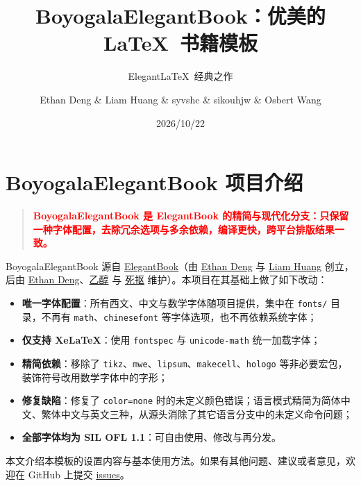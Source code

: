 \documentclass[lang=cn,10pt,scheme=chinese]{boyogalaelegantbook}
\title{BoyogalaElegantBook：优美的 \LaTeX\ 书籍模板}   %
\subtitle{Elegant\LaTeX\ 经典之作}                    %
\author{Ethan Deng \& Liam Huang \& syvshc \& sikouhjw \& Osbert Wang}  %
\institute{Elegant\LaTeX\ Program}                     %
\date{2026/10/22}                                        %
\begin{document}
\maketitle

\frontmatter

\tableofcontents

\mainmatter

\chapter{BoyogalaElegantBook 项目介绍}

\begin{quotation}
  \textbf{\textcolor{red}{BoyogalaElegantBook 是 ElegantBook 的精简与现代化分支：只保留一种字体配置，去除冗余选项与多余依赖，编译更快，跨平台排版结果一致。}}
\end{quotation}

BoyogalaElegantBook 源自 \href{https://github.com/ElegantLaTeX/ElegantBook}{ElegantBook}（由 \href{https://github.com/EthanDeng}{Ethan Deng} 与 \href{https://github.com/Liam0205}{Liam Huang} 创立，后由 \href{https://github.com/EthanDeng}{Ethan Deng}、\href{https://github.com/syvshc}{乙醇} 与 \href{https://github.com/sikouhjw}{死抠} 维护）。本项目在其基础上做了如下改动：

\begin{itemize}
  \item \textbf{唯一字体配置}：所有西文、中文与数学字体随项目提供，集中在 \lstinline{fonts/} 目录，不再有 \lstinline{math}、\lstinline{chinesefont} 等字体选项，也不再依赖系统字体；
  \item \textbf{仅支持 XeLaTeX}：使用 \lstinline{fontspec} 与 \lstinline{unicode-math} 统一加载字体；
  \item \textbf{精简依赖}：移除了 \lstinline{tikz}、\lstinline{mwe}、\lstinline{lipsum}、\lstinline{makecell}、\lstinline{hologo} 等非必要宏包，装饰符号改用数学字体中的字形；
  \item \textbf{修复缺陷}：修复了 \lstinline{color=none} 时的未定义颜色错误；语言模式精简为简体中文、繁体中文与英文三种，从源头消除了其它语言分支中的未定义命令问题；
  \item \textbf{全部字体均为 SIL OFL 1.1}：可自由使用、修改与再分发。
\end{itemize}

本文介绍本模板的设置内容与基本使用方法。如果有其他问题、建议或者意见，欢迎在 GitHub 上提交 \href{https://github.com/boyogala/BoyogalaElegantBook/issues}{issues}。
\end{document}
